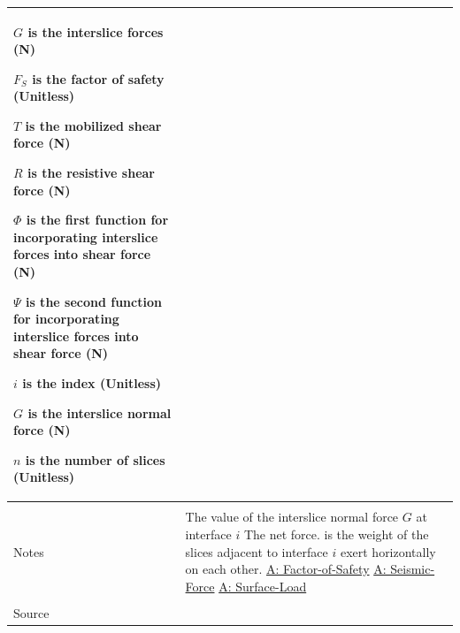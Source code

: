 \documentclass[12pt]{article}
\begin{document}
\begin{minipage}{\textwidth}
\begin{tabular}{p{} p{}}
\begin{symbDescription}
                                                                                           \item{$G$ is the interslice forces (N)}
                                                                                           \item{${F_{S}}$ is the factor of safety (Unitless)}
                                                                                           \item{$T$ is the mobilized shear force (N)}
                                                                                           \item{$R$ is the resistive shear force (N)}
                                                                                           \item{$Φ$ is the first function for incorporating interslice forces into shear force (N)}
                                                                                           \item{$Ψ$ is the second function for incorporating interslice forces into shear force (N)}
                                                                                           \item{$i$ is the index (Unitless)}
                                                                                           \item{$G$ is the interslice normal force (N)}
                                                                                           \item{$n$ is the number of slices (Unitless)}
                                                                                           \end{symbDescription}
                                                                                           \\ \midrule \\
                                                                                           Notes & The value of the interslice normal force $G$ at interface $i$ The net force. is the weight of the slices adjacent to interface $i$ exert horizontally on each other. \hyperref[assumpFOS]{A: Factor-of-Safety} \hyperref[assumpSF]{A: Seismic-Force} \hyperref[assumpSL]{A: Surface-Load}
                                                                                                   \\ \midrule \\
                                                                                                   Source & \cite{chen2005}

\end{tabular}
\end{minipage}
\end{document}
